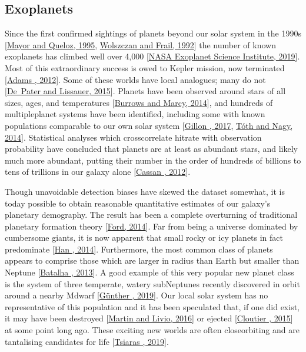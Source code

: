 \documentclass[letterpaper,10pt,english]{jupyterBook}
\begin{document}
\subsection{Exoplanets}
\label{\detokenize{content/chapter_01_background/main:exoplanets}}
\sphinxAtStartPar
Since the first confirmed sightings of planets beyond our solar system in the 1990s {[}\hyperlink{cite.references:id497}{Mayor and Queloz, 1995}, \hyperlink{cite.references:id3}{Wolszczan and Frail, 1992}{]} the number of known exoplanets has climbed well over 4,000 {[}\hyperlink{cite.references:id12}{NASA Exoplanet Science Institute, 2019}{]}. Most of this extraordinary success is owed to Kepler mission, now terminated {[}\hyperlink{cite.references:id574}{Adams , 2012}{]}. Some of these worlds have local analogues; many do not {[}\hyperlink{cite.references:id503}{De Pater and Lissauer, 2015}{]}. Planets have been observed around stars of all sizes, ages, and temperatures {[}\hyperlink{cite.references:id571}{Burrows and Marcy, 2014}{]}, and hundreds of multiple\sphinxhyphen{}planet systems have been identified, including some with known populations comparable to our own solar system {[}\hyperlink{cite.references:id297}{Gillon , 2017}, \hyperlink{cite.references:id298}{Tóth and Nagy, 2014}{]}. Statistical analyses which cross\sphinxhyphen{}correlate hit\sphinxhyphen{}rate with observation probability have concluded that planets are at least as abundant stars, and likely much more abundant, putting their number in the order of hundreds of billions to tens of trillions in our galaxy alone {[}\hyperlink{cite.references:id296}{Cassan , 2012}{]}.

\sphinxAtStartPar
Though unavoidable detection biases have skewed the dataset somewhat, it is today possible to obtain reasonable quantitative estimates of our galaxy’s planetary demography. The result has been a complete overturning of traditional planetary formation theory {[}\hyperlink{cite.references:id585}{Ford, 2014}{]}. Far from being a universe dominated by cumbersome giants, it is now apparent that small rocky or icy planets in fact predominate {[}\hyperlink{cite.references:id294}{Han , 2014}{]}. Furthermore, the most common class of planets appears to comprise those which are larger in radius than Earth but smaller than Neptune {[}\hyperlink{cite.references:id576}{Batalha , 2013}{]}. A good example of this very popular new planet class is the system of three temperate, watery sub\sphinxhyphen{}Neptunes recently discovered in orbit around a nearby M\sphinxhyphen{}dwarf {[}\hyperlink{cite.references:id580}{Günther , 2019}{]}. Our local solar system has no representative of this population and it has been speculated that, if one did exist, it may have been destroyed {[}\hyperlink{cite.references:id309}{Martin and Livio, 2016}{]} or ejected {[}\hyperlink{cite.references:id581}{Cloutier , 2015}{]} at some point long ago. These exciting new worlds are often close\sphinxhyphen{}orbiting and are tantalising candidates for life {[}\hyperlink{cite.references:id587}{Tsiaras , 2019}{]}.
\end{document}
